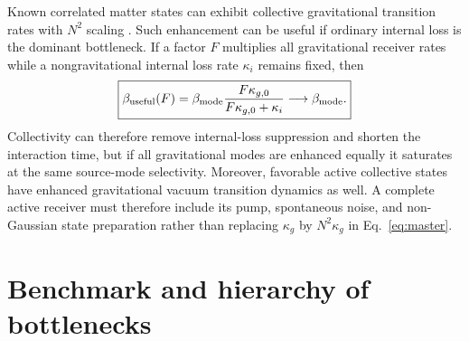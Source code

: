 Known correlated matter states can exhibit collective gravitational transition rates with $N^2$ scaling \cite{QuinonesEtAl2017}. Such enhancement can be useful if ordinary internal loss is the dominant bottleneck. If a factor $F$ multiplies all gravitational receiver rates while a nongravitational internal loss rate $\kappa_i$ remains fixed, then
\begin{equation}
\boxed{
\beta_{\rm useful}(F)
=\beta_{\rm mode}
\frac{F\kappa_{g,0}}{F\kappa_{g,0}+\kappa_i}
\longrightarrow\beta_{\rm mode}.}
\label{eq:activebeta}
\end{equation}
Collectivity can therefore remove internal-loss suppression and shorten the interaction time, but if all gravitational modes are enhanced equally it saturates at the same source-mode selectivity. Moreover, favorable active collective states have enhanced gravitational vacuum transition dynamics as well. A complete active receiver must therefore include its pump, spontaneous noise, and non-Gaussian state preparation rather than replacing $\kappa_g$ by $N^2\kappa_g$ in Eq.~\eqref{eq:master}.

\section{Benchmark and hierarchy of bottlenecks}
\label{sec:benchmark}


